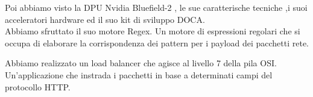 \documentclass[binding=0.6cm]{sapthesis}
\theoremstyle{definition}
\begin{document}
Poi abbiamo visto la DPU Nvidia Bluefield-2 , le sue caratterische tecniche ,i suoi 
acceleratori hardware ed il suo kit di sviluppo DOCA.\\
Abbiamo sfruttato il suo motore Regex. Un motore di espressioni regolari
che si occupa di elaborare la corrispondenza dei pattern per i payload dei pacchetti rete.

Abbiamo realizzato un load balancer che agisce al livello 7 della pila OSI.
Un'applicazione che instrada i pacchetti in base a determinati campi del protocollo HTTP.





\backmatter
  
\end{document}
